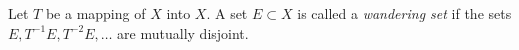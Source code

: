 Let $T$ be a mapping of $X$ into $X$. A set $E \subset X$ is called a \textit{wandering set} if the sets $E, T^{-1}E, T^{-2}E, \ldots$ are mutually disjoint.

